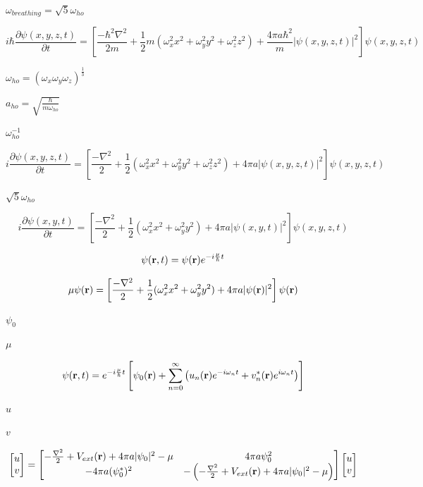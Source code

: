\documentclass{article}
\begin{document}
$ \omega_{breathing}=\sqrt{5}\omega_{ho}$
\pagebreak

\[
    i\hbar\frac{\partial \psi(x,y,z,t)}{\partial t} =
    \left[
        \frac{-\hbar^2\nabla^2}{2m}+\frac{1}{2}m(\omega^2_x x^2+\omega^2_y y^2 +\omega_z^2 z^2)
        + \frac{4\pi a\hbar^2}{m}|\psi(x,y,z,t)|^2
    \right]\psi(x,y,z,t)
\]
\pagebreak

$ \omega_{ho} = (\omega_x\omega_y\omega_z)^{\frac{1}{3}} $
\pagebreak

$ a_{ho} = \sqrt{\frac{\hbar}{m\omega_{ho}}} $
\pagebreak

$ \omega_{ho}^{-1} $
\pagebreak

\[
    i\frac{\partial \psi(x,y,z,t)}{\partial t} =
    \left[
        \frac{-\nabla^2}{2}+\frac{1}{2}(\omega_x^2 x^2+\omega^2_y y^2+\omega_z^2 z^2)
        + 4\pi a  |\psi(x,y,z,t)|^2
    \right]\psi(x,y,z,t)
\]
\pagebreak

$ \sqrt{5}\omega_{ho} $
\pagebreak

\[
    i\frac{\partial \psi(x,y,t)}{\partial t} =
    \left[
        \frac{-\nabla^2}{2}+\frac{1}{2}(\omega_x^2 x^2+\omega^2_y y^2)
        + 4\pi a  |\psi(x,y,t)|^2
    \right]\psi(x,y,z,t)
\]
\pagebreak

\[
    \psi({\bf r},t) = \psi({\bf r})e^{-i\frac{\mu}{\hbar}t}
\]
\pagebreak

\[
   \mu \psi({\bf r}) =
    \left[
        \frac{-\nabla^2}{2}+\frac{1}{2}(\omega_x^2 x^2+\omega^2_y y^2)
        + 4\pi a  |\psi({\bf r})|^2
    \right]\psi({\bf r})
\]
\pagebreak

$ \psi_0 $
\pagebreak

$ \mu $
\pagebreak

\[
  \psi({\bf r},t) = e^{-i\frac{\mu}{\hbar}t}\left[ \psi_0({\bf r})
   + \sum_{n=0}^{\infty} \left( u_n({\bf r})e^{-i\omega_n t} + v^*_n({\bf r})e^{i\omega_n t} \right) \right]
\]
\pagebreak

$ u $
\pagebreak

$ v $
\pagebreak

\[

 \begin{bmatrix}
     u \\
     v
 \end{bmatrix}
     =
 \begin{bmatrix}
     -\frac{\nabla^2}{2} + V_{ext}({\bf r}) + 4\pi a |\psi_0|^2 - \mu & 4\pi a \psi_0^2 \\
     - 4\pi a (\psi_0^*)^2 &  -\left(-\frac{\nabla^2}{2} + V_{ext}({\bf r}) + 4 \pi a |\psi_0|^2-\mu\right)
 \end{bmatrix}
 \begin{bmatrix}
     u \\
     v
 \end{bmatrix}

\]
\pagebreak
\end{document}
